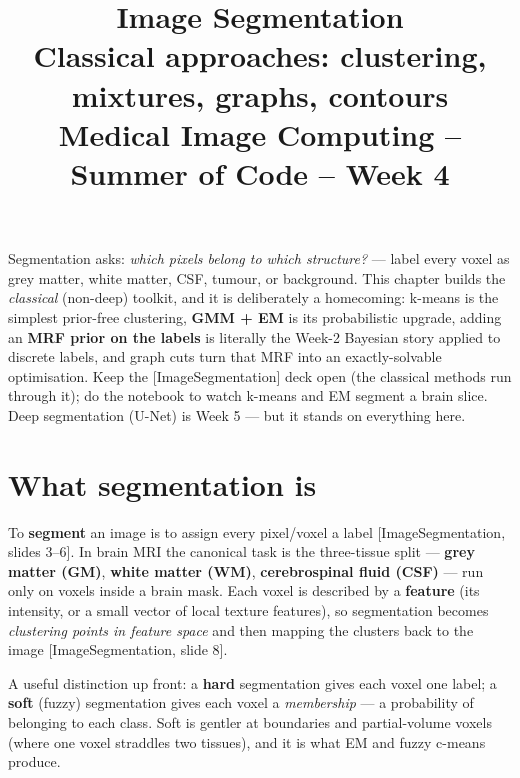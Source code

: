 \documentclass[11pt]{article}
\title{\textbf{Image Segmentation}\\[2pt]
\large Classical approaches: clustering, mixtures, graphs, contours\\[6pt]
\normalsize Medical Image Computing -- Summer of Code -- Week 4}
\author{}
\date{}
\newcommand{\deck}[1]{\textsf{\small[#1]}}
\begin{document}
\maketitle
\vspace{-2.2em}

\begin{keybox}
Segmentation asks: \emph{which pixels belong to which structure?} --- label every
voxel as grey matter, white matter, CSF, tumour, or background. This chapter
builds the \emph{classical} (non-deep) toolkit, and it is deliberately a
homecoming: k-means is the simplest prior-free clustering, \textbf{GMM + EM} is
its probabilistic upgrade, adding an \textbf{MRF prior on the labels} is literally
the Week-2 Bayesian story applied to discrete labels, and graph cuts turn that
MRF into an exactly-solvable optimisation. Keep the \deck{ImageSegmentation} deck
open (the classical methods run through it); do the notebook to watch k-means and
EM segment a brain slice. Deep segmentation (U-Net) is Week 5 --- but it stands on
everything here.
\end{keybox}

\tableofcontents
\bigskip

\section{What segmentation is}

To \textbf{segment} an image is to assign every pixel/voxel a label
\deck{ImageSegmentation, slides 3--6}. In brain MRI the canonical task is the
three-tissue split --- \textbf{grey matter (GM)}, \textbf{white matter (WM)},
\textbf{cerebrospinal fluid (CSF)} --- run only on voxels inside a brain mask.
Each voxel is described by a \textbf{feature} (its intensity, or a small vector of
local texture features), so segmentation becomes \emph{clustering points in
feature space} and then mapping the clusters back to the image
\deck{ImageSegmentation, slide 8}.

A useful distinction up front: a \textbf{hard} segmentation gives each voxel one
label; a \textbf{soft} (fuzzy) segmentation gives each voxel a \emph{membership}
--- a probability of belonging to each class. Soft is gentler at boundaries and
partial-volume voxels (where one voxel straddles two tissues), and it is what EM
and fuzzy c-means produce.
\end{document}
